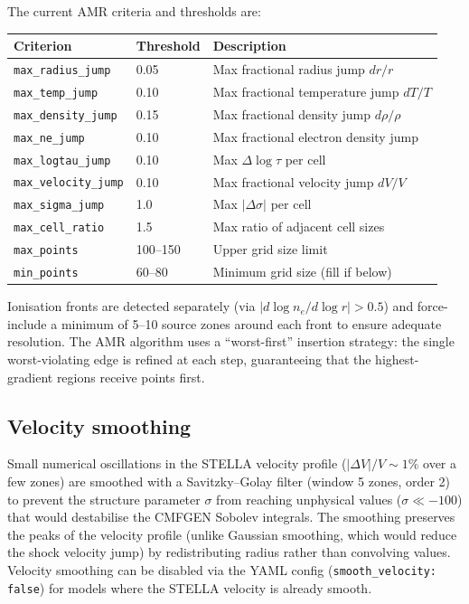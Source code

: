 \documentclass[11pt]{article}
\begin{document}
The current AMR criteria and thresholds are:

\begin{center}
\begin{tabular}{lll}
\toprule
Criterion & Threshold & Description \\
\midrule
\texttt{max\_radius\_jump}    & 0.05  & Max fractional radius jump $dr/r$ \\
\texttt{max\_temp\_jump}      & 0.10  & Max fractional temperature jump $dT/T$ \\
\texttt{max\_density\_jump}   & 0.15  & Max fractional density jump $d\rho/\rho$ \\
\texttt{max\_ne\_jump}        & 0.10  & Max fractional electron density jump \\
\texttt{max\_logtau\_jump}    & 0.10  & Max $\Delta\log\tau$ per cell \\
\texttt{max\_velocity\_jump}  & 0.10  & Max fractional velocity jump $dV/V$ \\
\texttt{max\_sigma\_jump}     & 1.0   & Max $|\Delta\sigma|$ per cell \\
\texttt{max\_cell\_ratio}     & 1.5   & Max ratio of adjacent cell sizes \\
\texttt{max\_points}          & 100--150 & Upper grid size limit \\
\texttt{min\_points}          & 60--80  & Minimum grid size (fill if below) \\
\bottomrule
\end{tabular}
\end{center}

Ionisation fronts are detected separately (via $|d\log n_e/d\log r| >
0.5$) and force-include a minimum of 5--10 source zones around each
front to ensure adequate resolution.  The AMR algorithm uses a
``worst-first'' insertion strategy: the single worst-violating edge is
refined at each step, guaranteeing that the highest-gradient regions
receive points first.

\subsection{Velocity smoothing}

Small numerical oscillations in the STELLA velocity profile
($|\Delta V|/V \sim 1\%$ over a few zones) are smoothed with a
Savitzky--Golay filter (window 5 zones, order 2) to prevent the
structure parameter $\sigma$ from reaching unphysical values
($\sigma \ll -100$) that would destabilise the CMFGEN Sobolev integrals.
The smoothing preserves the peaks of the velocity profile (unlike
Gaussian smoothing, which would reduce the shock velocity jump) by
redistributing radius rather than convolving values.  Velocity
smoothing can be disabled via the YAML config
(\texttt{smooth\_velocity: false}) for models where the STELLA velocity
is already smooth.
\end{document}
